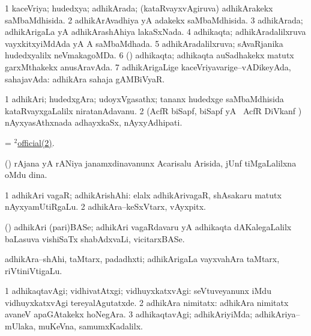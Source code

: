 \bentry
{}
\gl{\gu}
\bmng
\bnum
\num{1} kaceVriya; hudedxya; adhikArada; (kataRvayxvAgiruva) adhikArakekx saMbaMdhisida. 
\num{2} adhikArAvadhiya yA adakekx saMbaMdhisida. 
\num{3} adhikArada; adhikArigaLa yA adhikArashAhiya lakaSxNada. 
\num{4} adhikaqta; adhikAradalilxruva vayxkitxyiMdAda yA A saMbaMdhada. 
\num{5} adhikAradalilxruva; sAvaRjanika hudedxyalilx neVmakagoMDa. 
\num{6} (\veYshA) adhikaqta; adhikaqta auSadhakekx matutx garxMthakekx anusAravAda. 
\num{7} adhikArigaLige kaceVriyavarige--vADikeyAda, sahajavAda:  adhikAra sahaja gAMBiVyaR. 
\enum
\emng
\eentry

\bentry
{}
\gl{\nA}
\bmng
\bnum
\num{1} adhikAri; hudedxgAra; udoyxVgasathx; tananx hudedxge saMbaMdhisida kataRvayxgaLalilx niratanAdavanu. 
\hypertarget{official(2)2}{} 
\num{2} (AcfR biSapf, biSapf yA \kanmu\ AcfR DiVkanf \mo) nAyxyasAthxnada adhayxkaSx, nAyxyAdhipati. 
\enum
\emng

\noindent
\gl{\pagu}
\bmng
{} = \hyperlink{official(2)2}{$^2$official(2)}. 
\emng
\eentry

\bentry
{}
\gl{\nA}
\bmng
(\birx) rAjana yA rANiya janamxdinavanunx Acarisalu Arisida, jUnf tiMgaLalilxna oMdu dina. 
\emng
\eentry

\bentry
{}
\gl{\nA}
\bmng
\bnum
\num{1} adhikAri vagaR; adhikArishAhi:  elalx adhikArivagaR, shAsakaru matutx nAyxyamUtiRgaLu. 
\num{2} adhikAra--keSxVtarx, vAyxpitx. 
\enum
\emng
\eentry

\bentry
{}
\gl{\nA}
\bmng
(\hiV) adhikAri (pari)BASe; adhikAri vagaRdavaru yA adhikaqta dAKalegaLalilx baLasuva vishiSaTx shabAdxvaLi, vicitarxBASe. 
\emng
\eentry

\bentry
{}
\gl{\nA}
\bmng
adhikAra--shAhi, taMtarx, padadhxti; adhikArigaLa vayxvahAra taMtarx, riVtiniVtigaLu. 
\emng
\eentry

\bentry
{}
\gl{\kirxvi}
\bmng
\bnum
\num{1} adhikaqtavAgi; vidhivatAtxgi; vidhuyxkatxvAgi:  seVtuveyanunx iMdu vidhuyxkatxvAgi tereyalAgutatxde. 
\num{2} adhikAra nimitatx:  adhikAra nimitatx avaneV apaGAtakekx hoNegAra. 
\num{3} adhikaqtavAgi; adhikAriyiMda; adhikAriya--mUlaka, muKeVna, samumxKadalilx. 
\enum
\emng
\eentry

